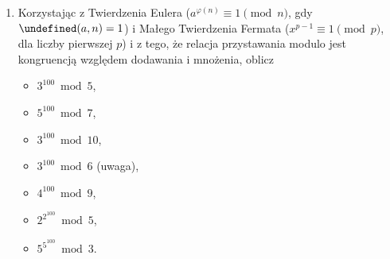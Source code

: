 \documentclass[12pt]{article}
\let\gcd\undefined
\DeclareMathOperator{\gcd}{gcd}
\begin{document}
\begin{enumerate}
\item Korzystając z Twierdzenia Eulera ($a^{\varphi(n)} \equiv 1 \pmod n$, gdy $\gcd(a,n)=1$) i Małego Twierdzenia Fermata 
($x^{p-1}\equiv 1 \pmod p$, dla liczby pierwszej $p$)
i z tego, że relacja przystawania modulo jest kongruencją
względem dodawania i mnożenia,
oblicz
\begin{itemize}
    \item $3^{100} \bmod 5$,
    \item $5^{100} \bmod 7$,
    \item $3^{100}\bmod 10$,
    \item $3^{100}\bmod 6$ (uwaga),
    \item $4^{100}\bmod 9$,
    \item $2^{2^{100}} \bmod 5$,
    \item $5^{5^{100}} \bmod 3$.
\end{itemize}

\end{enumerate}
\end{document}
